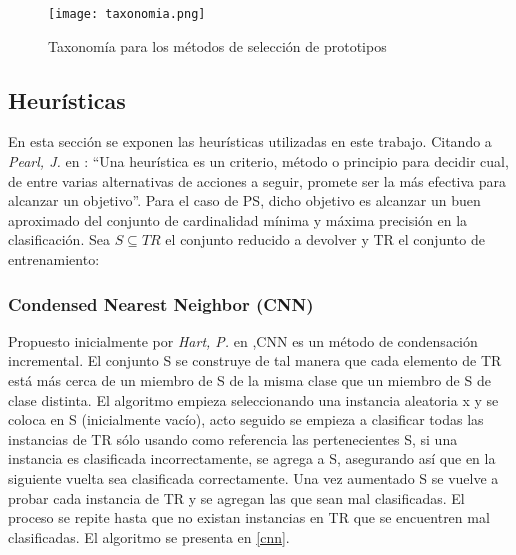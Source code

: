 \begin{figure}[]
\centering
\texttt{[image: taxonomia.png]}
\caption[Taxonomía para los métodos de selección de prototipos]{Taxonomía para los métodos de selección de prototipos}
\label{taxonomia}
\end{figure}

\subsection{Heurísticas}

En esta sección se exponen las heurísticas utilizadas en este trabajo. Citando a \emph{Pearl, J.} en \cite{pearl1984heuristics}: ``Una heurística es un criterio, método o principio para decidir cual, de entre varias alternativas de acciones a seguir, promete ser la más efectiva para alcanzar un objetivo''. Para el caso de PS, dicho objetivo es alcanzar un buen aproximado del conjunto de cardinalidad mínima y máxima precisión en la clasificación. Sea $S\subseteq TR$ el conjunto reducido a devolver y TR el conjunto de entrenamiento:

\subsubsection{Condensed Nearest Neighbor (CNN)}

Propuesto inicialmente por \emph{Hart, P.} en \cite{hart1968condensed},CNN es un método de condensación incremental. El conjunto S se construye de tal manera que cada elemento de TR está más cerca de un miembro de S de la misma clase que un miembro de S de clase distinta. El algoritmo empieza seleccionando una instancia aleatoria x y se coloca en S (inicialmente vacío), acto seguido se empieza a clasificar todas las instancias de TR sólo usando como referencia las pertenecientes S, si una instancia es clasificada incorrectamente, se agrega a S, asegurando así que en la siguiente vuelta sea clasificada correctamente. Una vez aumentado S se vuelve a probar cada instancia de TR y se agregan las que sean mal clasificadas. El proceso se repite hasta que no existan instancias en TR que se encuentren mal clasificadas. El algoritmo se presenta en \ref{cnn}. 

